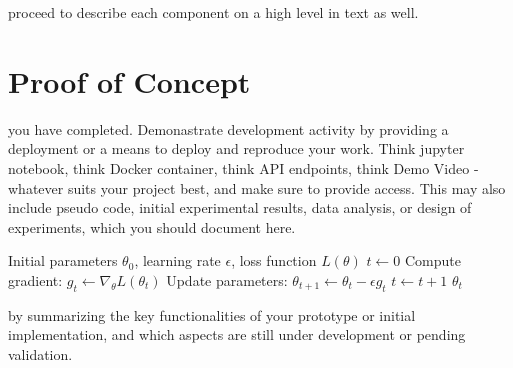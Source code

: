  proceed to describe each component on a high level in text as well. 







\section{Proof of Concept}

 you have completed. 
Demonastrate development activity by providing a deployment or a means to deploy and reproduce your work.
Think jupyter notebook, think Docker container, think API endpoints, think Demo Video - whatever suits your project best, 
and make sure to provide access.
This may also include pseudo code, initial experimental results, data analysis, or design of experiments, which you should document here.

\begin{algorithm}[H]
  \caption{Pseudo-code for Gradient Descent Optimization. If this is not beautiful, I don't know what is.}
  \label{alg:gradient_descent}
  \begin{algorithmic}[1]
    \Require Initial parameters $\theta_0$, learning rate $\epsilon$, loss function $L(\theta)$
    \State $t \gets 0$
      \State Compute gradient: $g_t \gets \nabla_\theta L(\theta_t)$
      \State Update parameters: $\theta_{t+1} \gets \theta_t - \epsilon g_t$
      \State $t \gets t + 1$
    \EndWhile
    \Return $\theta_t$
  \end{algorithmic}
\end{algorithm}

 by summarizing the key functionalities of your prototype or initial implementation, 
and which aspects are still under development or pending validation.




